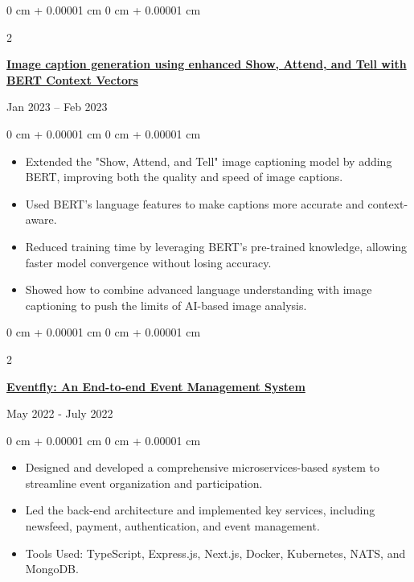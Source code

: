 \documentclass[10pt, letterpaper]{article}
\newenvironment{highlights}{
    \begin{itemize}[
        topsep=0.10 cm,
        parsep=0.10 cm,
        partopsep=0pt,
        itemsep=0pt,
        leftmargin=0 cm + 10pt
    ]
}{
    \end{itemize}
} %
\newenvironment{onecolentry}{
    \begin{adjustwidth}{
        0 cm + 0.00001 cm
    }{
        0 cm + 0.00001 cm
    }
}{
    \end{adjustwidth}
} %
\newenvironment{twocolentry}[2][]{
    \onecolentry
    \def\secondColumn{#2}
    \setcolumnwidth{\fill, 4.5 cm}
    \begin{paracol}{2}
}{
    \switchcolumn \raggedleft \secondColumn
    \end{paracol}
    \endonecolentry
} %
\begin{document}
        \begin{twocolentry}{
    {Jan 2023 – Feb 2023}
}
    \href{https://github.com/thromel/Image-Captioning-ML-Project}{\textbf{Image caption generation using enhanced Show, Attend, and Tell with BERT Context Vectors}}
\end{twocolentry}

\begin{onecolentry}
    \begin{highlights}
        \item Extended the "Show, Attend, and Tell" image captioning model by adding BERT, improving both the quality and speed of image captions.
        \item Used BERT's language features to make captions more accurate and context-aware.
        \item Reduced training time by leveraging BERT's pre-trained knowledge, allowing faster model convergence without losing accuracy.
        \item Showed how to combine advanced language understanding with image captioning to push the limits of AI-based image analysis.
    \end{highlights}
\end{onecolentry}
        
\begin{twocolentry}{
            {May 2022 - July 2022}
        }
            \href{https://github.com/eventfly/Microservices}{\textbf{Eventfly: An End-to-end Event Management System}}
        \end{twocolentry}
        
        \vspace{0.10 cm}
        
        \begin{onecolentry}
            \begin{highlights}
    \item Designed and developed a comprehensive microservices-based system to streamline event organization and participation.
    \item Led the back-end architecture and implemented key services, including newsfeed, payment, authentication, and event management.
    \item Tools Used: TypeScript, Express.js, Next.js, Docker, Kubernetes, NATS, and MongoDB.
\end{highlights}
        \end{onecolentry}


        \vspace{0.2 cm}
\end{document}
